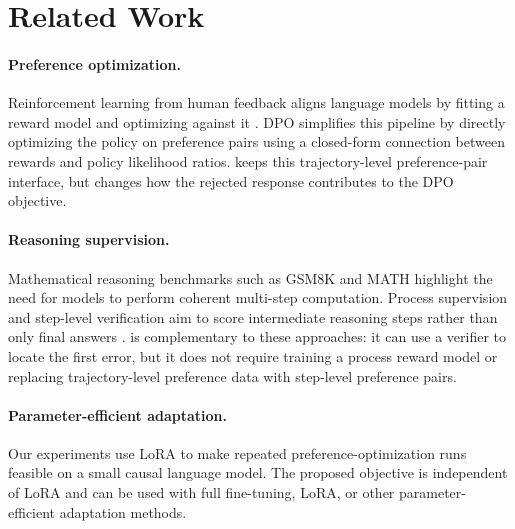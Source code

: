 \section{Related Work}

\paragraph{Preference optimization.}
Reinforcement learning from human feedback aligns language models by fitting a reward model and optimizing against it \citep{ouyang2022training}. DPO \citep{rafailov2023direct} simplifies this pipeline by directly optimizing the policy on preference pairs using a closed-form connection between rewards and policy likelihood ratios. \cmdpo keeps this trajectory-level preference-pair interface, but changes how the rejected response contributes to the DPO objective.

\paragraph{Reasoning supervision.}
Mathematical reasoning benchmarks such as GSM8K \citep{cobbe2021training} and MATH \citep{hendrycks2021measuring} highlight the need for models to perform coherent multi-step computation. Process supervision and step-level verification aim to score intermediate reasoning steps rather than only final answers \citep{lightman2023lets}. \cmdpo is complementary to these approaches: it can use a verifier to locate the first error, but it does not require training a process reward model or replacing trajectory-level preference data with step-level preference pairs.

\paragraph{Parameter-efficient adaptation.}
Our experiments use LoRA \citep{hu2022lora} to make repeated preference-optimization runs feasible on a small causal language model. The proposed objective is independent of LoRA and can be used with full fine-tuning, LoRA, or other parameter-efficient adaptation methods.
